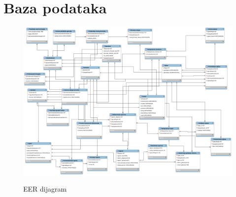 \documentclass[20pt]{article}
\begin{document}
\section{\bfseries \Large Baza podataka} 
\setlength{\parindent}{1cm}
\fontsize{13}{18} \selectfont 

\begin{figure}[h]
		\centering
		\includegraphics[width=1.1\textwidth,height=0.74\textheight]{Pictures/AgencijaZaNekretnine.png}\\
		\caption{EER dijagram}
		\label{fig:dijagramAktivnostiProveraUknjizenosti}
	\end{figure}
\end{document}
